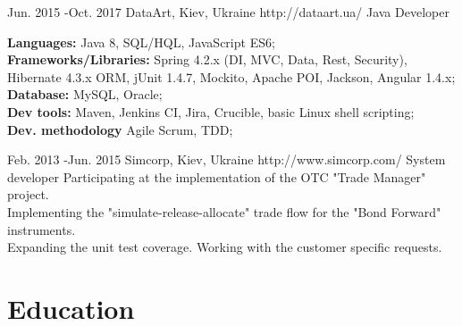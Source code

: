 \documentclass[10pt]{article} %
\begin{document}
\job
{Jun. 2015 -}{Oct. 2017}
{DataArt, Kiev, Ukraine}
{http://dataart.ua/}
{Java Developer}
{

\rule{0mm}{5mm}\textbf{Languages:}  Java 8, SQL/HQL, JavaScript ES6;
\\  \textbf{Frameworks/Libraries:}  Spring 4.2.x (DI, MVC, Data, Rest, Security), Hibernate 4.3.x ORM, jUnit 1.4.7, Mockito, Apache POI, Jackson, Angular 1.4.x;
\\ \textbf{Database:}  MySQL, Oracle;
\\  \textbf{Dev tools:} Maven, Jenkins CI, Jira, Crucible, basic Linux shell scripting;
\\  \textbf{Dev. methodology} Agile Scrum, TDD;
 }

\job
{Feb. 2013 -}{Jun. 2015}
{Simcorp, Kiev, Ukraine}
{http://www.simcorp.com/}
{System developer}
{Participating at the implementation of the OTC "Trade Manager" project. 
\\Implementing the "simulate-release-allocate" trade flow for the "Bond Forward" instruments. 
\\Expanding the unit test coverage. Working with the customer specific requests. \\
 }


\section{Education}

\end{document}

